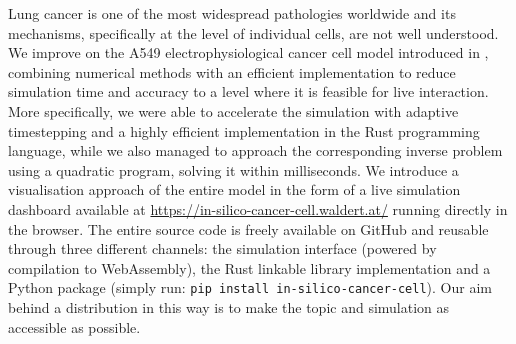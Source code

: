 Lung cancer is one of the most widespread pathologies worldwide and its mechanisms, specifically at the level of individual cells, are not well understood.
We improve on the A549 electrophysiological cancer cell model introduced in \cite{2021-A549-model,2024-calcium-channels}, combining numerical methods with an efficient implementation to reduce simulation time and accuracy to a level where it is feasible for live interaction.
More specifically, we were able to accelerate the simulation with adaptive timestepping and a highly efficient implementation in the Rust programming language, while we also managed to approach the corresponding inverse problem using a quadratic program, solving it within milliseconds.
We introduce a visualisation approach of the entire model in the form of a live simulation dashboard available at \url{https://in-silico-cancer-cell.waldert.at/} running directly in the browser.
The entire source code is freely available on GitHub and reusable through three different channels: the simulation interface (powered by compilation to WebAssembly), the Rust linkable library implementation and a Python package (simply run: \texttt{pip install in-silico-cancer-cell}).
Our aim behind a distribution in this way is to make the topic and simulation as accessible as possible.


